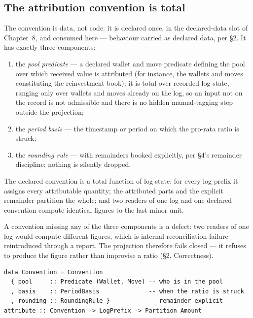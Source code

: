 \subsection{The attribution convention is total}

The convention is data, not code: it is declared once, in the declared-data
slot of Chapter~8, and consumed here --- behaviour carried as declared data,
per \S 2. It has exactly three components:

\begin{enumerate}[nosep]
\item the \emph{pool predicate} --- a declared wallet and move predicate
  defining the pool over which received value is attributed (for instance, the
  wallets and moves constituting the reinvestment book); it is total over recorded
  log state, ranging only over wallets and moves already on the log, so an input not
  on the record is not admissible and there is no hidden manual-tagging step outside
  the projection;
\item the \emph{period basis} --- the timestamp or period on which the pro-rata
  ratio is struck;
\item the \emph{rounding rule} --- with remainders booked explicitly, per
  \S 4's remainder discipline; nothing is silently dropped.
\end{enumerate}

\begin{principle}\label{prin:attr-total}
The declared convention is a total function of log state: for every log prefix
it assigns every attributable quantity; the attributed parts and the explicit
remainder partition the whole; and two readers of one log and one declared
convention compute identical figures to the last minor unit.
\end{principle}

A convention missing any of the three components is a defect: two readers of
one log would compute different figures, which is internal reconciliation
failure reintroduced through a report. The projection therefore fails closed
--- it refuses to produce the figure rather than improvise a ratio (\S 2,
Correctness).

\begin{lstlisting}
data Convention = Convention
  { pool     :: Predicate (Wallet, Move) -- who is in the pool
  , basis    :: PeriodBasis              -- when the ratio is struck
  , rounding :: RoundingRule }           -- remainder explicit
attribute :: Convention -> LogPrefix -> Partition Amount
\end{lstlisting}

